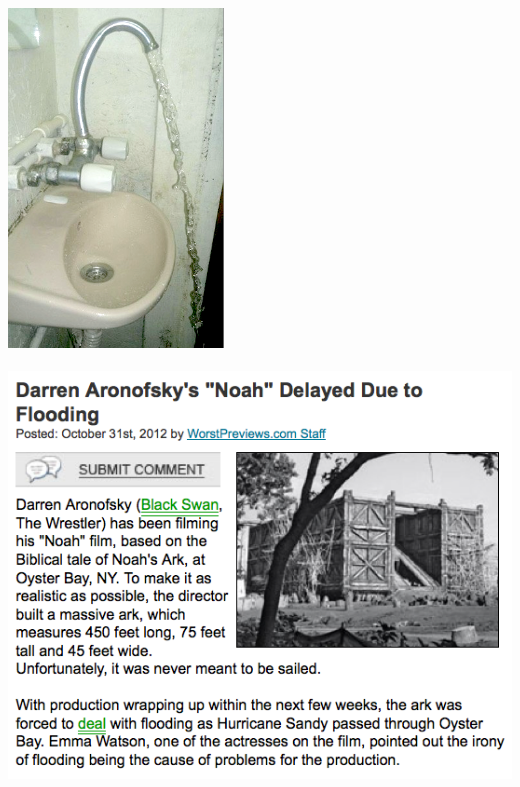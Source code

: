 \documentclass{beamer}
\begin{document}
\begin{frame}
  \begin{center}
    \includegraphics[height=9cm]{./imgs/sinkfail.png}
  \end{center}
\end{frame}

\begin{frame}
  \begin{center}
    \includegraphics[height=11cm]{./imgs/flooding.png}
  \end{center}
\end{frame}

\end{document}
